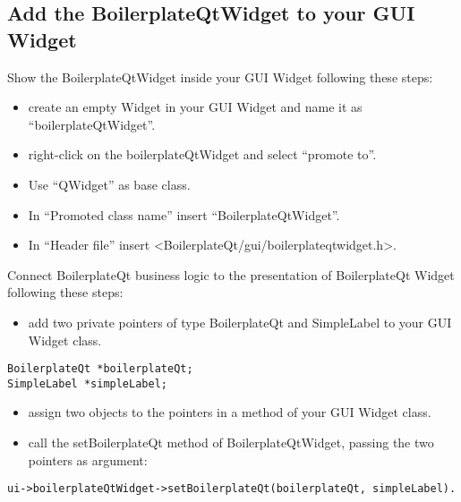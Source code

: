 \documentclass[
]{article}
\begin{document}
\hypertarget{header-n20}{%
\subsection{Add the BoilerplateQtWidget to your GUI
Widget}\label{header-n20}}

Show the BoilerplateQtWidget inside your GUI Widget following these
steps:

\begin{itemize}
\item
  create an empty Widget in your GUI Widget and name it as
  ``boilerplateQtWidget''.
\end{itemize}

\begin{itemize}
\item
  right-click on the boilerplateQtWidget and select ``promote to''.
\end{itemize}

\begin{itemize}
\item
  Use ``QWidget'' as base class.
\end{itemize}

\begin{itemize}
\item
  In ``Promoted class name'' insert ``BoilerplateQtWidget''.
\end{itemize}

\begin{itemize}
\item
  In ``Header file'' insert
  \textless BoilerplateQt/gui/boilerplateqtwidget.h\textgreater.
\end{itemize}

Connect BoilerplateQt business logic to the presentation of
BoilerplateQt Widget following these steps:

\begin{itemize}
\item
  add two private pointers of type BoilerplateQt and SimpleLabel to your
  GUI Widget class.
\end{itemize}

\begin{verbatim}
BoilerplateQt *boilerplateQt;
SimpleLabel *simpleLabel;
\end{verbatim}

\begin{itemize}
\item
  assign two objects to the pointers in a method of your GUI Widget
  class.
\end{itemize}

\begin{itemize}
\item
  call the setBoilerplateQt method of BoilerplateQtWidget, passing the
  two pointers as argument:
\end{itemize}

\begin{verbatim}
ui->boilerplateQtWidget->setBoilerplateQt(boilerplateQt, simpleLabel).
\end{verbatim}
\end{document}
